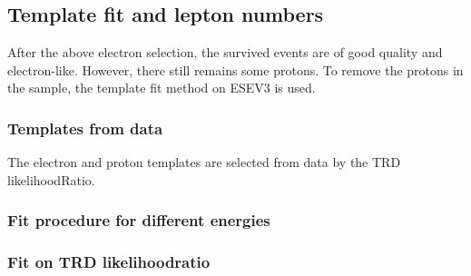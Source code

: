 \subsection{Template fit and lepton numbers}
After the above electron selection, the survived events are of good quality and electron-like. However, there still remains some protons. To remove the protons in the sample, the template fit method on ESEV3 is used.
\subsubsection{Templates from data}
The electron and proton templates are selected from data by the TRD likelihoodRatio.
\subsubsection{Fit procedure for different energies}
\subsubsection{Fit on TRD likelihoodratio}